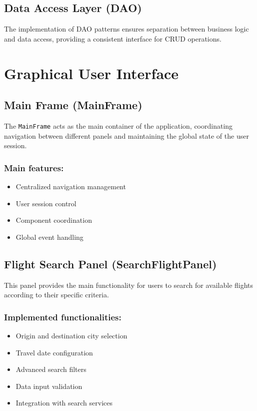 \documentclass[conference]{IEEEtran}
\begin{document}
\subsection{Data Access Layer (DAO)}
The implementation of DAO patterns ensures separation between business logic and data access, providing a consistent interface for CRUD operations.

\section{Graphical User Interface}

\subsection{Main Frame (MainFrame)}
The \texttt{MainFrame} acts as the main container of the application, coordinating navigation between different panels and maintaining the global state of the user session.

\subsubsection{Main features:}
\begin{itemize}
    \item Centralized navigation management
    \item User session control
    \item Component coordination
    \item Global event handling
\end{itemize}

\subsection{Flight Search Panel (SearchFlightPanel)}
This panel provides the main functionality for users to search for available flights according to their specific criteria.

\subsubsection{Implemented functionalities:}
\begin{itemize}
    \item Origin and destination city selection
    \item Travel date configuration
    \item Advanced search filters
    \item Data input validation
    \item Integration with search services
\end{itemize}
\end{document}
